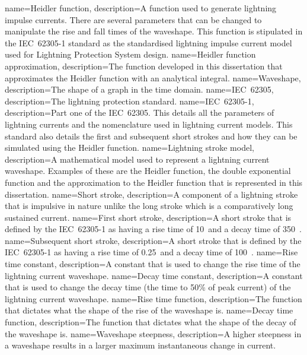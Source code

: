{
    name=Heidler function,
    description={A function used to generate lightning impulse currents. There are several parameters that can be changed to manipulate the rise and fall times of the waveshape. This function is stipulated in the IEC~62305-1 standard as the standardised lightning impulse current model used for Lightning Protection System design.}
}
{
    name=Heidler function approximation,
    description={The function developed in this dissertation that approximates the Heidler function with an analytical integral.}
}
{
    name=Waveshape,
    description={The shape of a graph in the time domain.}
}
{
    name=IEC~62305,
    description={The lightning protection standard.}
}
{
    name=IEC~62305-1,
    description={Part one of the IEC~62305. This details all the parameters of lightning currents and the nomenclature used in lightning current models. This standard also details the first and subsequent short strokes and how they can be simulated using the Heidler function.}
}
{
    name=Lightning stroke model,
    description={A mathematical model used to represent a lightning current waveshape. Examples of these are the Heidler function, the double exponential function and the approximation to the Heidler function that is represented in this dissertation.}
}
{
    name=Short stroke,
    description={A component of a lightning stroke that is impulsive in nature unlike the long stroke which is a comparatively long sustained current.}
}
{
    name=First short stroke,
    description={A short stroke that is defined by the IEC~62305-1 as having a rise time of 10~\usec and a decay time of 350~\usec.}
}
{
    name=Subsequent short stroke,
    description={A short stroke that is defined by the IEC~62305-1 as having a rise time of 0.25~\usec and a decay time of 100~\usec.}
}
{
    name=Rise time constant,
    description={A constant that is used to change the rise time of the lightning current waveshape.}
}
{
    name=Decay time constant,
    description={A constant that is used to change the decay time (the time to 50\% of peak current) of the lightning current waveshape.}
}
{
    name=Rise time function,
    description={The function that dictates what the shape of the rise of the waveshape is.}
}
{
    name=Decay time function,
    description={The function that dictates what the shape of the decay of the waveshape is.}
}
{
    name=Waveshape steepness,
    description={A higher steepness in a waveshape results in a larger maximum instantaneous change in current.}
}
